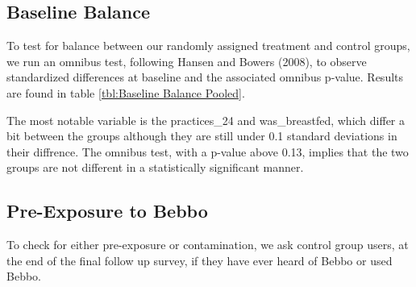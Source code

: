 \documentclass{article}
\begin{document}
\clearpage

\subsection*{Baseline Balance}

To test for balance between our randomly assigned treatment and control groups, we run an omnibus test, following Hansen and Bowers (2008), to observe standardized differences at baseline and the associated omnibus p-value. Results are found in table \ref{tbl:Baseline Balance Pooled}.

The most notable variable is the practices\_24 and was\_breastfed, which differ a bit between the groups although they are still under 0.1 standard deviations in their diffrence. The omnibus test, with a p-value above 0.13, implies that the two groups are not different in a statistically significant manner.



% 
% 










\subsection*{Pre-Exposure to Bebbo}

To check for either pre-exposure or contamination, we ask control group users, at the end of the final follow up survey, if they have ever heard of Bebbo or used Bebbo.
\end{document}
